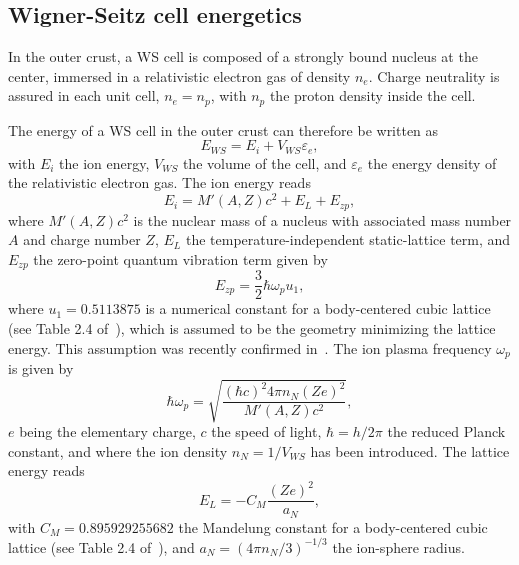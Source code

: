 \subsection{Wigner-Seitz cell energetics}\label{subsec:ws}

In the outer crust, a WS cell is composed of a strongly bound nucleus at the 
center, immersed in a relativistic electron gas of 
density $n_e$. Charge neutrality is assured in each unit cell, 
$n_e = n_p$, with $n_p$ the proton density inside the cell.

The energy of a WS cell in the outer crust can therefore be written as
%
\begin{equation}
  E_{WS} = E_i + V_{WS}\varepsilon_e,\label{eq:ews_ocrust}
\end{equation}
%
with $E_i$ the ion energy, $V_{WS}$ the volume of the cell, and $\varepsilon_e$ the 
energy density of the relativistic electron gas.
The ion energy reads
%
\begin{equation}
  E_i = M'(A,Z)c^2 + E_L + E_{zp},\label{eq:eion}
\end{equation}
%
where $M'(A,Z)c^2$ is the nuclear mass of a nucleus with associated mass number 
$A$ and charge number $Z$, $E_L$ the temperature-independent static-lattice 
term, and $E_{zp}$ the zero-point quantum vibration term given by
%
\begin{equation}
  E_{zp} = \frac{3}{2}\hbar \omega_p u_1,\label{eq:ezp}
\end{equation}
%
where $u_1 = 0.5113875$ is a numerical constant for a body-centered cubic
lattice (see Table 2.4 of~\cite{Haensel2007}), 
which is assumed to be the geometry minimizing the lattice energy. This
assumption was recently confirmed in~\cite{Chamel2016}. The ion
plasma frequency $\omega_p$ is given by
%
\begin{equation}
  \hbar \omega_p = \sqrt{\frac{(\hbar c)^2 4\pi n_N
  (Ze)^2}{M'(A,Z)c^2}},\label{eq:omegap}
\end{equation}
%
$e$ being the elementary charge, $c$ the speed of light, $\hbar = h/2\pi$
the reduced Planck constant, and where the ion density $n_N = 1/V_{WS}$ has
been introduced. 
The lattice energy reads
%
\begin{equation}
  E_L = -C_M \frac{(Ze)^2}{a_N},\label{eq:eL}
\end{equation}
%
with $C_M = 0.895929255682$ the Mandelung constant for a body-centered cubic 
lattice (see Table 2.4 of~\cite{Haensel2007}), and $a_N = (4\pi n_N/3)^{-1/3}$ 
the ion-sphere radius.

